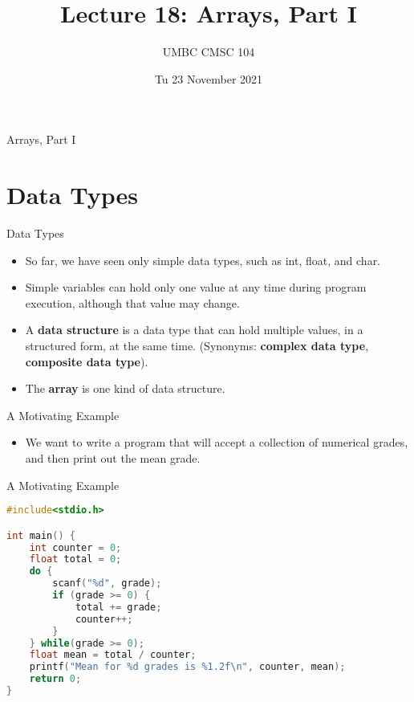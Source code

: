 \documentclass[graphics]{beamer}
\title{Lecture 18: Arrays, Part I}
\author{UMBC CMSC 104}
\date{Tu 23 November 2021}
\begin{document}
\begin{frame}{}
\centering
    Arrays, Part I
\end{frame}

\frame{\tableofcontents}

\section{Data Types}
\begin{frame}{Data Types}
    \begin{itemize}
        \item So far, we have seen only simple data types, such as int, float, and char.
        \item Simple variables can hold only one value at any time during program execution, although that value may change.
        \item A \textbf{data structure} is a data type that can hold multiple values, in a structured form, at the same time.  (Synonyms:  \textbf{complex data type}, \textbf{composite data type}).
        \item The \textbf{array} is one kind of data structure.
    \end{itemize}
\end{frame}

\begin{frame}{A Motivating Example}
    \begin{itemize}
        \item We want to write a program that will accept a collection of numerical grades, and then print out the mean grade.
    \end{itemize}
\end{frame}

\begin{frame}[fragile]{A Motivating Example}
    \begin{lstlisting}[language=C,basicstyle=\footnotesize,keywordstyle=\color{blue},commentstyle=\color{green},showstringspaces=false,stringstyle=\color{red}]
#include<stdio.h>

int main() {
    int counter = 0;
    float total = 0;
    do {
        scanf("%d", grade);
        if (grade >= 0) {
            total += grade;
            counter++;
        }
    } while(grade >= 0);
    float mean = total / counter;
    printf("Mean for %d grades is %1.2f\n", counter, mean);
    return 0;
}
    \end{lstlisting}
\end{frame}
\end{document}
